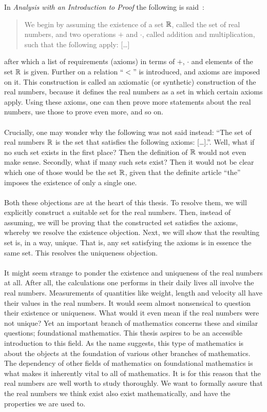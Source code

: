 \documentclass[../main.tex]{subfiles}
\begin{document}
In \textit{Analysis with an Introduction to Proof} the following is said~\cite{Lay2014}:
\begin{quote}
    We begin by assuming the existence of a set $\mathbb{R}$, called the set of real numbers, and two operations $+$ and $\cdot$, called addition and multiplication, such that the following apply: [\ldots]
\end{quote}
after which a list of requirements (axioms) in terms of $+$, $\cdot$ and elements of the set $\mathbb{R}$ is given. Further on a relation ``$<$'' is introduced, and axioms are imposed on it. This construction is called an axiomatic (or synthetic) construction of the real numbers, because it defines the real numbers as a set in which certain axioms apply. Using these axioms, one can then prove more statements about the real numbers, use those to prove even more, and so on. \\\\
Crucially, one may wonder why the following was not said instead: ``The set of real numbers $\mathbb{R}$ is the set that satisfies the following axioms: [\ldots].''. Well, what if no such set exists in the first place? Then the definition of $\mathbb{R}$ would not even make sense. Secondly, what if many such sets exist? Then it would not be clear which one of those would be the set $\mathbb{R}$, given that the definite article ``the'' imposes the existence of only a single one. \\\\
Both these objections are at the heart of this thesis. To resolve them, we will explicitly construct a suitable set for the real numbers. Then, instead of assuming, we will be proving that the constructed set satisfies the axioms, whereby we resolve the existence objection. Next, we will show that the resulting set is, in a way, unique. That is, any set satisfying the axioms is in essence the same set. This resolves the uniqueness objection. \\\\
It might seem strange to ponder the existence and uniqueness of the real numbers at all. After all, the calculations one performs in their daily lives all involve the real numbers. Measurements of quantities like weight, length and velocity all have their values in the real numbers. It would seem almost nonsensical to question their existence or uniqueness. What would it even mean if the real numbers were not unique? Yet an important branch of mathematics concerns these and similar questions; foundational mathematics. This thesis aspires to be an accessible introduction to this field. As the name suggests, this type of mathematics is about the objects at the foundation of various other branches of mathematics. The dependency of other fields of mathematics on foundational mathematics is what makes it inherently vital to all of mathematics. It is for this reason that the real numbers are well worth to study thoroughly. We want to formally assure that the real numbers we think exist also exist mathematically, and have the properties we are used to. \\\\
\end{document}

